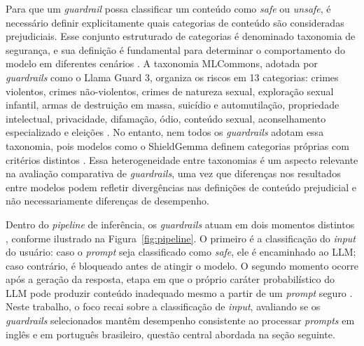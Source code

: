 Para que um \textit{guardrail} possa classificar um conteúdo como \textit{safe} ou \textit{unsafe}, é necessário definir explicitamente quais categorias de conteúdo são consideradas prejudiciais. Esse conjunto estruturado de categorias é denominado taxonomia de segurança, e sua definição é fundamental para determinar o comportamento do modelo em diferentes cenários \cite{weidinger2022taxonomy}. A taxonomia MLCommons, adotada por \textit{guardrails} como o Llama Guard 3, organiza os riscos em 13 categorias: crimes violentos, crimes não-violentos, crimes de natureza sexual, exploração sexual infantil, armas de destruição em massa, suicídio e automutilação, propriedade intelectual, privacidade, difamação, ódio, conteúdo sexual, aconselhamento especializado e eleições \cite{llamaguard3hf}. No entanto, nem todos os \textit{guardrails} adotam essa taxonomia, pois modelos como o ShieldGemma definem categorias próprias com critérios distintos \cite{zeng2024shieldgemma}. Essa heterogeneidade entre taxonomias é um aspecto relevante na avaliação comparativa de \textit{guardrails}, uma vez que diferenças nos resultados entre modelos podem refletir divergências nas definições de conteúdo prejudicial e não necessariamente diferenças de desempenho.

Dentro do \textit{pipeline} de inferência, os \textit{guardrails} atuam em dois momentos distintos \cite{inan2023llamaguard}, conforme ilustrado na Figura~\ref{fig:pipeline}. O primeiro é a classificação do \textit{input} do usuário: caso o \textit{prompt} seja classificado como \textit{safe}, ele é encaminhado ao LLM; caso contrário, é bloqueado antes de atingir o modelo. O segundo momento ocorre após a geração da resposta, etapa em que o próprio caráter probabilístico do LLM pode produzir conteúdo inadequado mesmo a partir de um \textit{prompt} seguro \cite{yin2025bingoguard}. Neste trabalho, o foco recai sobre a classificação de \textit{input}, avaliando se os \textit{guardrails} selecionados mantêm desempenho consistente ao processar \textit{prompts} em inglês e em português brasileiro, questão central abordada na seção seguinte.


